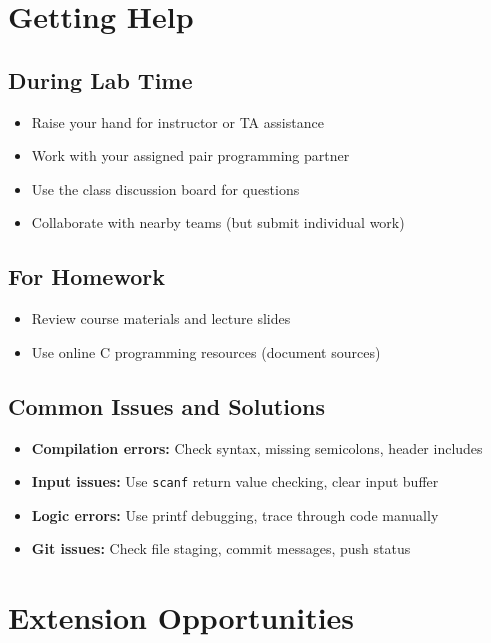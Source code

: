 \documentclass[11pt,a4paper]{article}
\begin{document}
\section{Getting Help}

\subsection{During Lab Time}
\begin{itemize}
    \item Raise your hand for instructor or TA assistance
    \item Work with your assigned pair programming partner
    \item Use the class discussion board for questions
    \item Collaborate with nearby teams (but submit individual work)
\end{itemize}

\subsection{For Homework}
\begin{itemize}
    \item Review course materials and lecture slides
    \item Use online C programming resources (document sources)
\end{itemize}

\subsection{Common Issues and Solutions}
\begin{itemize}
    \item \textbf{Compilation errors:} Check syntax, missing semicolons, header includes
    \item \textbf{Input issues:} Use \texttt{scanf} return value checking, clear input buffer
    \item \textbf{Logic errors:} Use printf debugging, trace through code manually
    \item \textbf{Git issues:} Check file staging, commit messages, push status
\end{itemize}

\section{Extension Opportunities}
\end{document}
